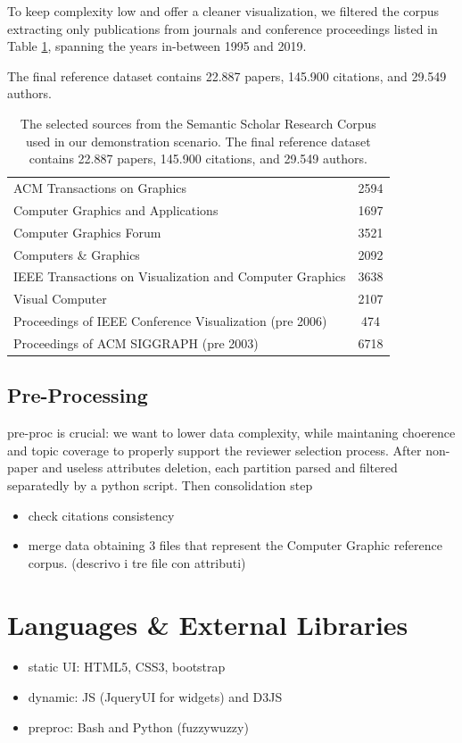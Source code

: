 To keep complexity low and offer a cleaner visualization, we filtered the corpus extracting only publications from journals and conference proceedings listed in Table \ref{table:sources}, spanning the years in-between 1995 and 2019. 

The final reference dataset contains 22.887 papers, 145.900 citations, and 29.549 authors.
\begin{table}[!h]
\renewcommand{\arraystretch}{1.3}
\centering
\begin{tabular}{|l|c|}
\hline
ACM Transactions on Graphics & 2594\\ 
Computer Graphics and Applications  & 1697 \\ 
Computer Graphics Forum & 3521\\ 
Computers \& Graphics & 2092\\ 
IEEE Transactions on Visualization and Computer Graphics & 3638\\ 
Visual Computer & 2107\\ 
Proceedings of IEEE Conference Visualization (pre 2006) & 474 \\ 
Proceedings of ACM SIGGRAPH (pre 2003) & 6718\\
\hline
\end{tabular}
\caption{The selected sources from the Semantic Scholar Research Corpus used in our demonstration scenario. The final reference dataset contains 22.887 papers, 145.900 citations, and 29.549 authors.}
\label{table:sources}
\end{table}

%
\subsection*{Pre-Processing}
\label{sec:preproc}

pre-proc is crucial: we want to lower data complexity, while maintaning choerence and topic coverage to properly support the reviewer selection process. After non-paper and useless attributes deletion, each partition parsed and filtered separatedly by a python script. Then consolidation step 
\begin{itemize}
    \item check citations consistency
    \item merge data obtaining 3 files that represent the Computer Graphic reference corpus. (descrivo i tre file con attributi)
\end{itemize}

\section{Languages \& External Libraries}
\label{sec:lang}
\begin{itemize}
    \item static UI: HTML5, CSS3, bootstrap
    \item dynamic: JS (JqueryUI for widgets) and D3JS
    \item preproc: Bash and Python (fuzzywuzzy) 
\end{itemize}

